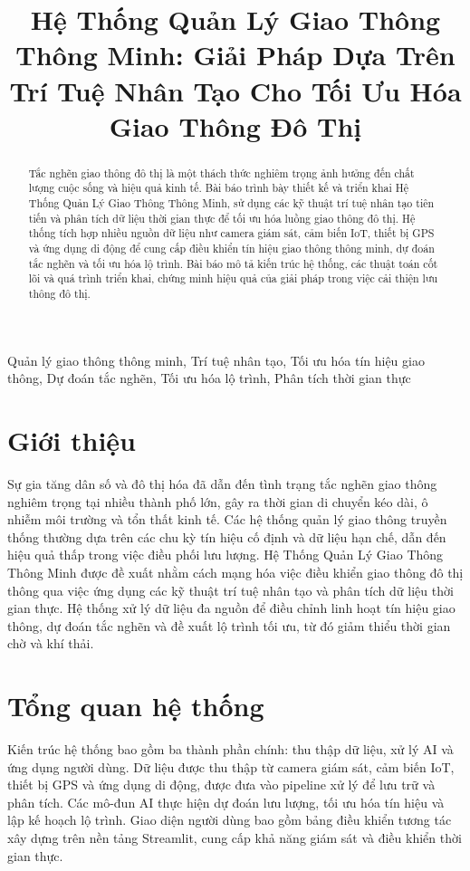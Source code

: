\documentclass[conference]{IEEEtran}
\title{Hệ Thống Quản Lý Giao Thông Thông Minh: Giải Pháp Dựa Trên Trí Tuệ Nhân Tạo Cho Tối Ưu Hóa Giao Thông Đô Thị}
\author{
    \IEEEauthorblockN{Huy Tran, Phu Nguyen, Thant Thiri Maung}
    \IEEEauthorblockA{Khoa Công Nghệ Thông Tin\\
    Đại học Tôn Đức Thắng\\
    Email: author@example.com}
}
\begin{document}
\maketitle

\begin{abstract}
Tắc nghẽn giao thông đô thị là một thách thức nghiêm trọng ảnh hưởng đến chất lượng cuộc sống và hiệu quả kinh tế. Bài báo trình bày thiết kế và triển khai Hệ Thống Quản Lý Giao Thông Thông Minh, sử dụng các kỹ thuật trí tuệ nhân tạo tiên tiến và phân tích dữ liệu thời gian thực để tối ưu hóa luồng giao thông đô thị. Hệ thống tích hợp nhiều nguồn dữ liệu như camera giám sát, cảm biến IoT, thiết bị GPS và ứng dụng di động để cung cấp điều khiển tín hiệu giao thông thông minh, dự đoán tắc nghẽn và tối ưu hóa lộ trình. Bài báo mô tả kiến trúc hệ thống, các thuật toán cốt lõi và quá trình triển khai, chứng minh hiệu quả của giải pháp trong việc cải thiện lưu thông đô thị.
\end{abstract}

\begin{IEEEkeywords}
Quản lý giao thông thông minh, Trí tuệ nhân tạo, Tối ưu hóa tín hiệu giao thông, Dự đoán tắc nghẽn, Tối ưu hóa lộ trình, Phân tích thời gian thực
\end{IEEEkeywords}

\section{Giới thiệu}
Sự gia tăng dân số và đô thị hóa đã dẫn đến tình trạng tắc nghẽn giao thông nghiêm trọng tại nhiều thành phố lớn, gây ra thời gian di chuyển kéo dài, ô nhiễm môi trường và tổn thất kinh tế. Các hệ thống quản lý giao thông truyền thống thường dựa trên các chu kỳ tín hiệu cố định và dữ liệu hạn chế, dẫn đến hiệu quả thấp trong việc điều phối lưu lượng. Hệ Thống Quản Lý Giao Thông Thông Minh được đề xuất nhằm cách mạng hóa việc điều khiển giao thông đô thị thông qua việc ứng dụng các kỹ thuật trí tuệ nhân tạo và phân tích dữ liệu thời gian thực. Hệ thống xử lý dữ liệu đa nguồn để điều chỉnh linh hoạt tín hiệu giao thông, dự đoán tắc nghẽn và đề xuất lộ trình tối ưu, từ đó giảm thiểu thời gian chờ và khí thải.

\section{Tổng quan hệ thống}
Kiến trúc hệ thống bao gồm ba thành phần chính: thu thập dữ liệu, xử lý AI và ứng dụng người dùng. Dữ liệu được thu thập từ camera giám sát, cảm biến IoT, thiết bị GPS và ứng dụng di động, được đưa vào pipeline xử lý để lưu trữ và phân tích. Các mô-đun AI thực hiện dự đoán lưu lượng, tối ưu hóa tín hiệu và lập kế hoạch lộ trình. Giao diện người dùng bao gồm bảng điều khiển tương tác xây dựng trên nền tảng Streamlit, cung cấp khả năng giám sát và điều khiển thời gian thực.
\end{document}
